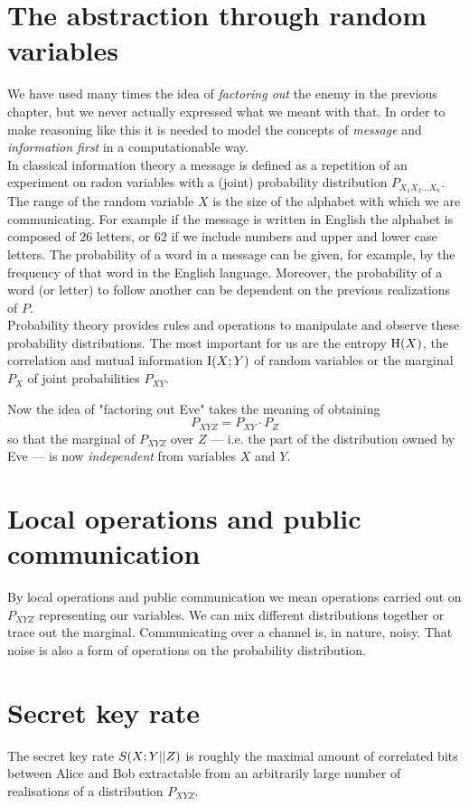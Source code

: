 \section{The abstraction through random variables}
    We have used many times the idea of \textit{factoring out} the enemy in the previous chapter, but we never actually expressed what we meant with that.
    In order to make reasoning like this it is needed to model the concepts of \textit{message} and \textit{information first} in a computationable way.\\
    In classical information theory a message is defined as a repetition of an experiment on radon variables with a (joint) probability distribution $P_{X_1X_2\ldots X_n}$.
    The range of the random variable $X$ is the size of the alphabet with which we are communicating.
    For example if the message is written in English the alphabet is composed of $26$ letters, or $62$ if we include numbers and upper and lower case letters.
    The probability of a word in a message can be given, for example, by the frequency of that word in the English language.
    Moreover, the probability of a word (or letter) to follow another can be dependent on the previous realizations of $P$.\\
    Probability theory provides rules and operations to manipulate and observe these probability distributions.
    The most important for us are the entropy $\operatorname{H} (X)$, the correlation and mutual information $\operatorname{I}(X;Y)$ of random variables or the marginal $P_X$ of joint probabilities $P_{XY}$.
    
    Now the idea of "factoring out Eve" takes the meaning of obtaining 
    $$P_{XYZ} = P_{XY}\cdot P_Z$$
    so that the marginal of $P_{XYZ}$ over $Z$ --- i.e. the part of the distribution owned by Eve --- is now \emph{independent} from variables $X$ and $Y$.
    
\section{Local operations and public communication}
    By local operations and public communication we mean operations carried out on $P_{XYZ}$ representing our variables.
    We can mix different distributions together or trace out the marginal.
    Communicating over a channel is, in nature, noisy. 
    That noise is also a form of operations on the probability distribution.
    
\section{Secret key rate} \label{seckeyrate}
    The secret key rate $S(X;Y||Z)$ is roughly the maximal amount of correlated bits between Alice and Bob extractable from an arbitrarily large number of realisations of a distribution $P_{XYZ}$.
